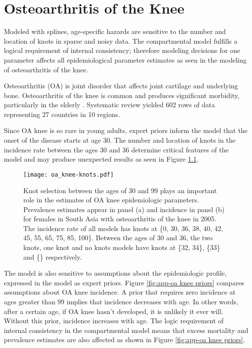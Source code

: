 \chapter{Osteoarthritis of the Knee}
\label{applications-con_fit_splines}

Modeled with splines, age-specific hazards are sensitive to the number and location of knots in sparse and noisy data.  The compartmental model fulfills a logical requirement of internal consistency; therefore modeling decisions for one parameter affects all epidemiological parameter estimates as seen in the modeling of osteoarthritis of the knee.

Osteoarthritis (OA) is joint disorder that affects joint cartilage and underlying bone. Osteoarthritis of the knee is common and produces significant morbidity, particularly in the elderly \cite{felson_epidemiology_1988, felson_incidence_1995}.  Systematic review yielded 602 rows of data representing 27 countries in 10 regions.

Since OA knee is so rare in young adults, expert priors inform the model that the onset of the disease starts at age 30.  The number and location of knots in the incidence rate between the ages 30 and 36 determine critical features of the model and may produce unexpected results as seen in Figure \ref{fig:app-oa knee knots}.

    \begin{figure}[h]
        \begin{center}
            \texttt{[image: oa\_knee-knots.pdf]}
            \caption{Knot selection between the ages of 30 and 99 plays an important role in the estimates of OA knee epidemiologic parameters.  Prevalence estimates appear in panel (a) and incidence in panel (b) for females in South Asia with osteoarthritis of the knee in 2005.  The incidence rate of all models has knots at \{0, 30, 36, 38, 40, 42, 45, 55, 65, 75, 85, 100\}.  Between the ages of 30 and 36, the two knots, one knot and no knots models have knots at \{32, 34\}, \{33\} and \{\} respectively.}
            \label{fig:app-oa knee knots}
        \end{center}
    \end{figure}

The model is also sensitive to assumptions about the epidemiologic profile, expressed in the model as expert priors.  Figure \ref{fig:app-oa knee priors} compares assumptions about OA knee incidence.  A prior that requires zero incidence at ages greater than 99 implies that incidence decreases with age.  In other words, after a certain age, if OA knee hasn't developed, it is unlikely it ever will. Without this prior, incidence increases with age.  The logic requirement of internal consistency in the compartmental model means that excess mortality and prevalence estimates are also affected as shown in Figure \ref{fig:app-oa knee priors}.

